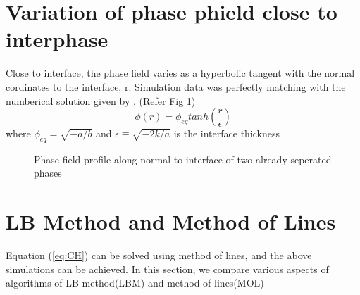 \documentclass{article}
\begin{document}
\section{Variation of phase phield close to interphase}
Close to interface, the phase field varies as a hyperbolic tangent with the normal cordinates to the interface, r. Simulation data was perfectly matching with the numberical solution given by \cite{arXiv:1104.0078}. (Refer Fig \ref*{fig:tanh}) \newline
\begin{equation}
	\phi(r) = \phi_{eq}tan h(\frac{r}{\epsilon})
\end{equation}
where $\phi_{eq} = \sqrt{-a/b}$ and $\epsilon \equiv \sqrt{-2k/a}$ is the interface thickness
\begin{figure}[h!]
	\begin{center}
		\caption{Phase field profile along normal to interface of two already seperated phases }
		\label{fig:tanh}
	\end{center}

\end{figure}

\section{LB Method and Method of Lines}
Equation (\ref{eq:CH}) can be solved using method of lines, and the above simulations can be achieved. In this section, we compare various aspects of algorithms of LB method(LBM) and method of lines(MOL)
\end{document}

